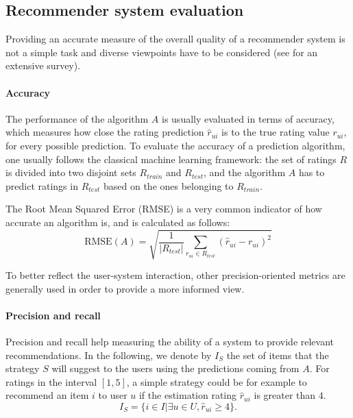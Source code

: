 \subsection{Recommender system
evaluation}\label{eval} Providing an accurate measure of the overall quality of
a recommender system is not a simple task and diverse viewpoints have to be
considered (see \cite{RecoSystemHandbook} for an extensive survey). 



\paragraph{Accuracy\\}
The performance of the algorithm $A$ is usually evaluated in terms of accuracy,
which measures how close the rating prediction $\hat{r}_{ui}$ is to the true
rating value $r_{ui}$, for every possible prediction. To evaluate the accuracy
of a prediction algorithm, one usually follows the classical machine learning
framework: the set of ratings $R$ is divided into two disjoint sets $R_{train}$
and $R_{test}$, and the algorithm $A$ has to predict ratings in $R_{test}$
based on the ones belonging to $R_{train}$.

The Root Mean Squared Error (RMSE) is a very common indicator of how accurate
an algorithm is, and is calculated as follows:
$$\text{RMSE}(A) = \sqrt{\frac{1}{|R_{test}|}\sum_{r_{ui} \in
R_{test}}(\hat{r}_{ui} - r_{ui})^2}$$

To better reflect the user-system interaction, other precision-oriented metrics
are generally used in order to provide a more informed view.

\paragraph{Precision and recall\\}
Precision and recall help measuring the ability of a system to provide
relevant recommendations.
In the following, we denote by $I_{S}$ the set of items that the strategy
$S$ will suggest to the users using the predictions coming from $A$. For
ratings in the interval $[1, 5]$, a simple strategy could be for example to
recommend an item $i$ to user $u$ if the estimation rating $\hat{r}_{ui}$ is
greater than $4$.  $$I_S = \{i \in I | \exists u \in U, \hat{r}_{ui} \geq
4\}.$$

